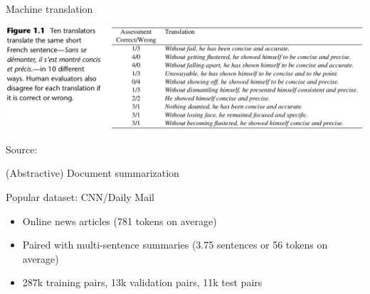\documentclass[12pt,aspectratio=169,handout]{beamer}
\begin{document}
\begin{frame}{Machine translation}
	

\includegraphics[width=15cm]{img/mt2.png}
	
	
Source: 
	
\end{frame}


\begin{frame}{(Abstractive) Document summarization}

Popular dataset: CNN/Daily Mail

\begin{itemize}
	\item Online news articles (781 tokens on average)
	\item Paired with multi-sentence summaries (3.75 sentences or 56 tokens on average)
	\item 287k training pairs, 13k validation pairs, 11k test pairs
\end{itemize}


\end{frame}
\end{document}
